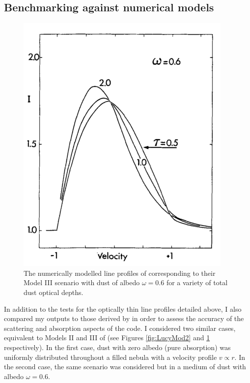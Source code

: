 \subsection{Benchmarking against numerical models}
\label{opt_thick_testing}
\begin{figure}
\centering
\includegraphics[trim =0 0 0 0,clip=true,scale=0.6]{chapters/chapter4/images/Lucy89_Model3.png}
\caption{The numerically modelled line profiles of \citep{Lucy1989} corresponding to their Model III scenario with dust of albedo $\omega=0.6$ for a variety of total dust optical depths.}
\label{fig:LucyMod3}
\end{figure}



In addition to the tests for the optically thin line profiles detailed above, I also compared my outputs to those derived by \citet{Lucy1989} in order to assess the accuracy of the scattering and absorption aspects of the code.  
I  considered two similar cases, equivalent to Models II and III of 
\citet{Lucy1989} (see Figures \ref{fig:LucyMod2} and \ref{fig:LucyMod3} respectively). In the first case, dust with zero albedo (pure absorption) was 
uniformly distributed throughout a filled nebula with a velocity profile 
$v \propto r$.  In the second case, the same scenario was considered but in a 
medium of dust with albedo $\omega =0.6$.

